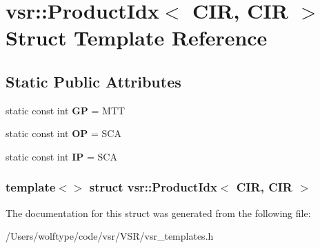 \hypertarget{structvsr_1_1_product_idx_3_01_c_i_r_00_01_c_i_r_01_4}{\section{vsr\-:\-:Product\-Idx$<$ C\-I\-R, C\-I\-R $>$ Struct Template Reference}
\label{structvsr_1_1_product_idx_3_01_c_i_r_00_01_c_i_r_01_4}
}
\subsection*{Static Public Attributes}
\begin{DoxyCompactItemize}
\item 
\hypertarget{structvsr_1_1_product_idx_3_01_c_i_r_00_01_c_i_r_01_4_a0d3d816e4b7694cfd5cc3c81528cdb50}{static const int {\bfseries G\-P} = M\-T\-T}\label{structvsr_1_1_product_idx_3_01_c_i_r_00_01_c_i_r_01_4_a0d3d816e4b7694cfd5cc3c81528cdb50}

\item 
\hypertarget{structvsr_1_1_product_idx_3_01_c_i_r_00_01_c_i_r_01_4_ac65a2ebef5118e3477147f0f294acbec}{static const int {\bfseries O\-P} = S\-C\-A}\label{structvsr_1_1_product_idx_3_01_c_i_r_00_01_c_i_r_01_4_ac65a2ebef5118e3477147f0f294acbec}

\item 
\hypertarget{structvsr_1_1_product_idx_3_01_c_i_r_00_01_c_i_r_01_4_a3ac4fb82f7855f7b48a22cf481bdf21d}{static const int {\bfseries I\-P} = S\-C\-A}\label{structvsr_1_1_product_idx_3_01_c_i_r_00_01_c_i_r_01_4_a3ac4fb82f7855f7b48a22cf481bdf21d}

\end{DoxyCompactItemize}
\subsubsection*{template$<$$>$ struct vsr\-::\-Product\-Idx$<$ C\-I\-R, C\-I\-R $>$}



The documentation for this struct was generated from the following file\-:\begin{DoxyCompactItemize}
\item 
/\-Users/wolftype/code/vsr/\-V\-S\-R/vsr\-\_\-templates.\-h\end{DoxyCompactItemize}
